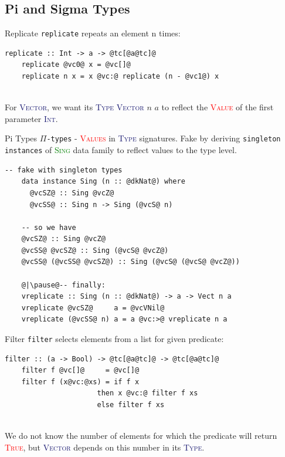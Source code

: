 \documentclass[xcolor={usenames,dvipsnames}]{beamer}
\newcommand{\htycon}[1]{\textcolor{MidnightBlue}{\textsc{#1}}}
\newcommand{\hvalcon}[1]{\textcolor{Red}{\textsc{#1}}}
\newcommand{\htyfam}[1]{\textcolor{Green}{\textsc{#1}}}
\begin{document}
\subsection{Pi and Sigma Types}

\begin{frame}[fragile]{Replicate}
  \texttt{replicate} repeats an element n times:
  \begin{lstlisting}[style=hask]
    replicate :: Int -> a -> @tc[@a@tc]@
    replicate @vc0@ x = @vc[]@
    replicate n x = x @vc:@ replicate (n - @vc1@) x
  \end{lstlisting}

  \ \\
  For \htycon{Vector}, we want its \htycon{Type} \htycon{Vector} $n$ $a$ to reflect the \hvalcon{Value} of the first parameter \htycon{Int}.
\end{frame}

\begin{frame}[fragile]{Pi Types}
  \texttt{$\Pi$-types} - \hvalcon{Values} in \htycon{Type} signatures. Fake by deriving \texttt{singleton instances} of \htyfam{Sing} data family to reflect values to the type level.
  \begin{lstlisting}[style=hask]
    -- fake with singleton types
    data instance Sing (n :: @dkNat@) where
      @vcSZ@ :: Sing @vcZ@
      @vcSS@ :: Sing n -> Sing (@vcS@ n)

    -- so we have
    @vcSZ@ :: Sing @vcZ@
    @vcSS@ @vcSZ@ :: Sing (@vcS@ @vcZ@)
    @vcSS@ (@vcSS@ @vcSZ@) :: Sing (@vcS@ (@vcS@ @vcZ@))

    @|\pause@-- finally:
    vreplicate :: Sing (n :: @dkNat@) -> a -> Vect n a
    vreplicate @vcSZ@     a = @vcVNil@
    vreplicate (@vcSS@ n) a = a @vc:>@ vreplicate n a
  \end{lstlisting}
\end{frame}

\begin{frame}[fragile]{Filter}
  \texttt{filter} selects elements from a list for given predicate:
  \begin{lstlisting}[style=hask]
    filter :: (a -> Bool) -> @tc[@a@tc]@ -> @tc[@a@tc]@
    filter f @vc[]@     = @vc[]@
    filter f (x@vc:@xs) = if f x
                      then x @vc:@ filter f xs
                      else filter f xs
  \end{lstlisting}

  \ \\
  We do not know the number of elements for which the predicate will return \hvalcon{True}, but \htycon{Vector} depends on this number in its \htycon{Type}.
\end{frame}
\end{document}
